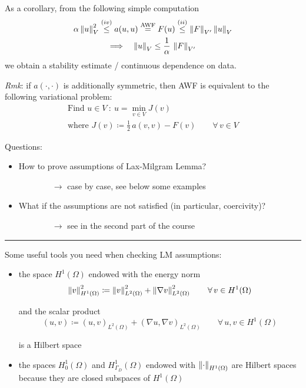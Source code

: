 As a corollary, from the following simple computation
\begin{gather}
\alpha \left\lVert u \right\rVert_V^2 \overset{(iv)}{\leq} a(u,u) \overset{\text{AWF}}{=} F(u) \overset{(ii)}{\leq} \left\lVert F \right\rVert_{V'} \left\lVert u \right\rVert_V \nonumber \\
\Longrightarrow\quad \left\lVert u \right\rVert_V \leq \frac{1}{\alpha}\, \left\lVert F \right\rVert_{V'} \label{eqn:contData}
\end{gather}
we obtain a stability estimate / continuous dependence on data.

\smallskip

\emph{Rmk}: if $a(\cdot,\cdot)$ is additionally symmetric, then AWF is equivalent to the following variational problem:
\begin{equation*}
\begin{gathered}
\boxed{\text{Find }u\in V\ :\ u=\min_{v\in V} J(v)} \\
\text{where } J(v)\coloneq \frac{1}{2}\,a(v,v)-F(v) \qquad \forall\,v\in V
\end{gathered}
\end{equation*}

Questions:
\begin{itemize}
    \item How to prove assumptions of Lax-Milgram Lemma?

    $\qquad\qquad \to$ case by case, see below some examples

    \item What if the assumptions are not satisfied (in particular, coercivity)? 

    $\qquad\qquad \to$ see in the second part of the course
\end{itemize}

\rule{0.47\textwidth}{0.2pt}

\smallskip

Some useful tools you need when checking LM assumptions:
\begin{itemize}
    \item the space $H^1(\Omega)$ endowed with the energy norm
    \begin{equation*}
    \left\lVert v \right\rVert_{H^1(\Omega)}^2\coloneq \left\lVert v \right\rVert_{L^2(\Omega)}^2+\left\lVert \nabla v \right\rVert_{L^2(\Omega)}^2 \qquad \forall\,v\in  H^1(\Omega)
    \end{equation*}

    and the scalar product
    \begin{equation*}
    (u,v)\coloneq (u,v)_{L^2(\Omega)}+(\nabla u,\nabla v)_{L^2(\Omega)}\qquad \forall\,u,v\in  H^1(\Omega)
    \end{equation*}

    is a Hilbert space

    \item the spaces $H^1_0(\Omega)$ and $H^1_{\Gamma_D}(\Omega)$ endowed with $\left\lVert \cdot \right\rVert_{H^1(\Omega)}$ are Hilbert spaces because they are closed subspaces of $H^1(\Omega)$
\end{itemize}

